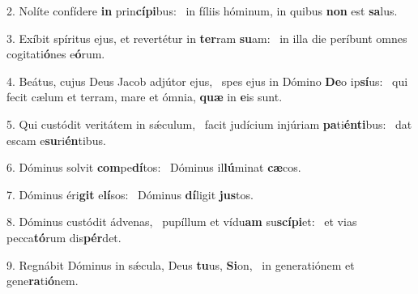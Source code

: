 2. Nolíte confídere \textbf{in} prin\textbf{cí}\textbf{pi}bus: \ast\  in fíliis hóminum, in quibus \textbf{non} est \textbf{sa}lus.\

3. Exíbit spíritus ejus, et revertétur in \textbf{ter}ram \textbf{su}am: \ast\  in illa die períbunt omnes cogitati\textbf{ó}nes e\textbf{ó}rum.\

4. Beátus, cujus Deus Jacob adjútor ejus, \dag\  spes ejus in Dómino \textbf{De}o ip\textbf{sí}us: \ast\  qui fecit cælum et terram, mare et ómnia, \textbf{quæ} in \textbf{e}is sunt.\

5. Qui custódit veritátem in sǽculum, \dag\  facit judícium injúriam \textbf{pa}ti\textbf{én}\textbf{ti}bus: \ast\  dat escam e\textbf{su}ri\textbf{én}tibus.\

6. Dóminus solvit \textbf{com}pe\textbf{dí}tos: \ast\  Dóminus il\textbf{lú}minat \textbf{cæ}cos.\

7. Dóminus éri\textbf{git} e\textbf{lí}sos: \ast\  Dóminus \textbf{dí}ligit \textbf{jus}tos.\

8. Dóminus custódit ádvenas, \dag\  pupíllum et vídu\textbf{am} su\textbf{scí}\textbf{pi}et: \ast\  et vias pecca\textbf{tó}rum dis\textbf{pér}det.\

9. Regnábit Dóminus in sǽcula, Deus \textbf{tu}us, \textbf{Si}on, \ast\  in generatiónem et gene\textbf{ra}ti\textbf{ó}nem.\

